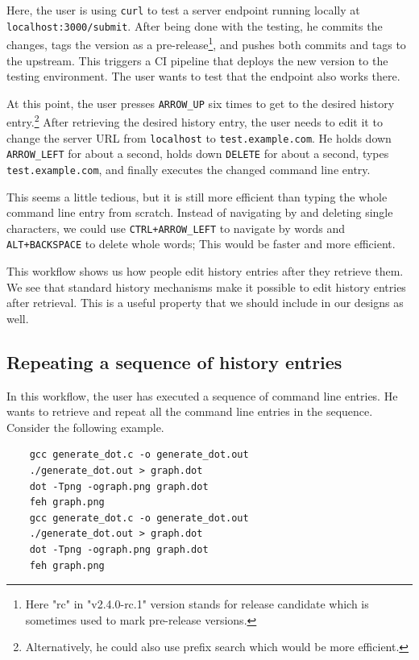 Here, the user is using \verb|curl| to test a server endpoint running locally at \verb|localhost:3000/submit|. After being done with the testing, he commits the changes, tags the version as a pre-release\footnote{Here "rc" in "v2.4.0-rc.1" version stands for release candidate which is sometimes used to mark pre-release versions.}, and pushes both commits and tags to the upstream. This triggers a CI pipeline that deploys the new version to the testing environment. The user wants to test that the endpoint also works there.

At this point, the user presses \verb|ARROW_UP| six times to get to the desired history entry.\footnote{Alternatively, he could also use prefix search which would be more efficient.} 
After retrieving the desired history entry, the user needs to edit it to change the server URL from \verb|localhost| to \verb|test.example.com|. He holds down \verb|ARROW_LEFT| for about a second, holds down \verb|DELETE| for about a second, types \verb|test.example.com|, and finally executes the changed command line entry. 

This seems a little tedious, but it is still more efficient than typing the whole command line entry from scratch. Instead of navigating by and deleting single characters, we could use \verb|CTRL+ARROW_LEFT| to navigate by words and \verb|ALT+BACKSPACE| to delete whole words; This would be faster and more efficient. %

This workflow shows us how people edit history entries after they retrieve them. We see that standard history mechanisms make it possible to edit history entries after retrieval. %
This is a useful property that we should include in our designs as well. 

\subsection{Repeating a sequence of history entries}\label{workflow-repeating-a-sequence}

In this workflow, the user has executed a sequence of command line entries. He wants to retrieve and repeat all the command line entries in the sequence. 
Consider the following example.

\begin{verbatim}
    gcc generate_dot.c -o generate_dot.out
    ./generate_dot.out > graph.dot
    dot -Tpng -ograph.png graph.dot
    feh graph.png
    gcc generate_dot.c -o generate_dot.out
    ./generate_dot.out > graph.dot
    dot -Tpng -ograph.png graph.dot
    feh graph.png
\end{verbatim}

